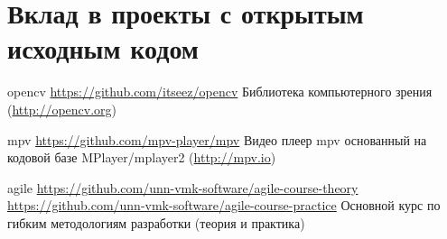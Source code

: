 \documentclass[12pt,a4paper]{moderncv}
\begin{document}
\section{Вклад в проекты с открытым исходным кодом}
\cvline
  {opencv}
  {\url{https://github.com/itseez/opencv}\newline{}
  Библиотека компьютерного зрения (\url{http://opencv.org})}

\cvline
  {mpv}
  {\url{https://github.com/mpv-player/mpv}\newline{}
  Видео плеер mpv основанный на кодовой базе MPlayer/mplayer2 \newline (\url{http://mpv.io})}

\cvline
  {agile}
  {
  \url{https://github.com/unn-vmk-software/agile-course-theory}\newline{}
  \url{https://github.com/unn-vmk-software/agile-course-practice}\newline{}
  Основной курс по гибким методологиям разработки (теория и практика)
  }
\end{document}
